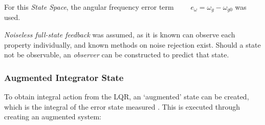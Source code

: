 %

For this \emph{State Space}, the angular frequency error term $\qquad e_{\omega} = \omega_{g} - \omega_{g0}$ was used.

\emph{Noiseless full-state feedback} was assumed, as it is known can observe each property individually, and known methods on noise rejection exist.
Should a state not be observable, an \emph{observer} can be constructed to predict that state. \cite{power:controlman}

\subsubsection{Augmented Integrator State}

To obtain integral action from the LQR, an `augmented' state can be created, which is the integral of the error state measured \cite{power:augstate}. This is executed through creating an augmented system:

